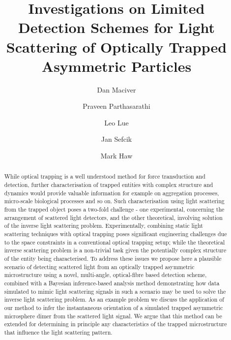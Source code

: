 \documentclass[final, 3p]{elsarticle}
\begin{document}
\begin{frontmatter}

\title{Investigations on Limited Detection Schemes for Light Scattering of Optically Trapped Asymmetric Particles}


\author[aff1]{Dan Maciver} 

\author[aff1]{Praveen Parthasarathi}

\author[aff1]{Leo Lue}

\author[aff1]{Jan Sefcik}

\author[aff1]{Mark Haw}






\begin{abstract}
	\label{sec:Abstract}
\justifying
While optical trapping is a well understood method for force transduction and detection, further characterisation of trapped entities with complex structure and dynamics would provide valuable information for example on aggregation processes, micro-scale biological processes and so on. Such characterisation using light scattering from the trapped object poses a two-fold challenge - one experimental, concerning the arrangement of scattered light detectors, and the other theoretical, involving solution of the inverse light scattering problem. Experimentally, combining static light scattering techniques with optical trapping poses significant engineering challenges due to the space constraints in a conventional optical trapping setup;  while the theoretical inverse scattering problem is a non-trivial task given the potentially complex structure of the entity being characterised. To address these issues we propose here a plausible scenario of detecting scattered light from an optically trapped asymmetric microstructure using a novel, multi-angle, optical-fibre based detection scheme, combined with a Bayesian inference-based analysis method demonstrating how data simulated to mimic light scattering signals in such a scenario may be used to solve the inverse light scattering problem. As an example problem we discuss the application of our method to infer the instantaneous orientation of a simulated trapped asymmetric microsphere dimer from the scattered light signal. We argue that this method can be extended for determining in principle any characteristics of the trapped microstructure that influence the light scattering pattern.
\end{abstract}


\end{frontmatter}
\end{document}
